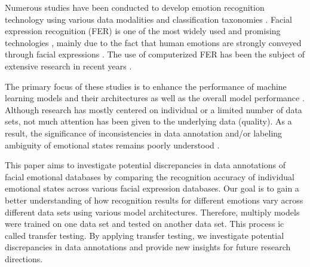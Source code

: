 \documentclass[a4paper, conference]{IEEEtran}
\begin{document}
Numerous studies have been conducted to develop emotion recognition technology using various data modalities and classification taxonomies \cite{huangStrategicFrameworkArtificial2021,marin-moralesAffectiveComputingVirtual2018}. %
Facial expression recognition (FER) is one of the most widely used and promising technologies \cite{generosiDeepLearningbasedSystem2018,shaoThreeConvolutionalNeural2019}, mainly due to the fact that human emotions are strongly conveyed through facial expressions \cite{darwinExpressionEmotionsMan1872, tianRecognizingActionUnits2001}. The use of computerized FER has been the subject of extensive research in recent years \cite{liDeepFacialExpression2020, melloukFacialEmotionRecognition2020}.

The primary focus of these studies is to enhance the performance of machine learning models and their architectures as well as the overall model performance \cite{rouastDeepLearningHuman2019}. Although research has mostly centered on individual or a limited number of data sets, not much attention has been given to the underlying data (quality). As a result, the significance of inconsistencies in data annotation and/or labeling ambiguity of emotional states remains poorly understood \cite{ekundayoFacialExpressionRecognition2021}.

This paper aims to investigate potential discrepancies in data annotations of facial emotional databases by comparing the recognition accuracy of individual emotional states across various facial expression databases. Our goal is to gain a better understanding of how recognition results for different emotions vary across different data sets using various model architectures. Therefore, multiply models were trained on one data set and tested on another data set. This process ic called transfer testing. By applying transfer testing, we investigate potential discrepancies in data annotations and provide new insights for future research directions.
%
\end{document}
